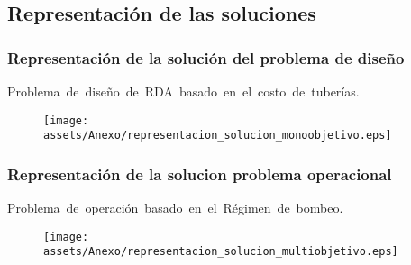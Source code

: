\documentclass[9pt]{beamer}
\begin{document}
    \subsection{Representación de las soluciones}
    \begin{frame}
        \frametitle{Representación de la solución del problema de diseño}
        Problema de diseño de RDA basado en el costo de tuberías.

        \begin{figure}
            \texttt{[image: assets/Anexo/representacion\_solucion\_monoobjetivo.eps]}
        \end{figure}

    \end{frame}

    \begin{frame}
        \frametitle{Representación de la solucion problema operacional}
        Problema de operación basado en el Régimen de bombeo.
        \begin{figure}
            \texttt{[image: assets/Anexo/representacion\_solucion\_multiobjetivo.eps]}
        \end{figure}

    \end{frame}
\end{document}
